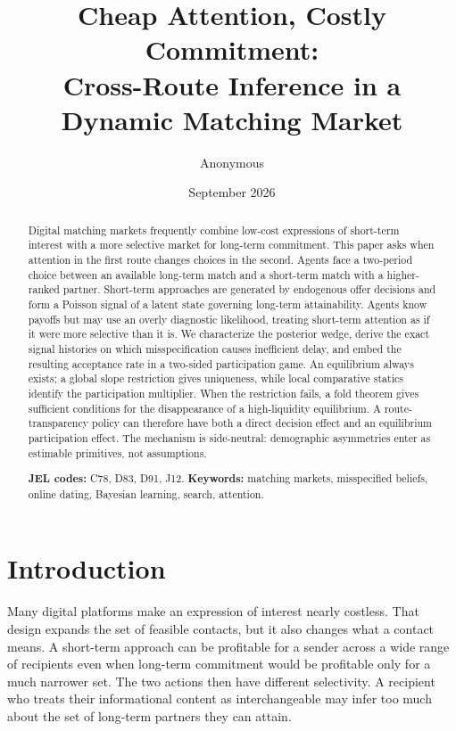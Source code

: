 \documentclass[11pt]{article}
\title{Cheap Attention, Costly Commitment:\\
Cross-Route Inference in a Dynamic Matching Market}
\author{Anonymous}
\date{September 2026}
\begin{document}
\maketitle

\begin{abstract}
Digital matching markets frequently combine low-cost expressions of short-term
interest with a more selective market for long-term commitment. This paper asks
when attention in the first route changes choices in the second. Agents face a
two-period choice between an available long-term match and a short-term match
with a higher-ranked partner. Short-term approaches are generated by endogenous
offer decisions and form a Poisson signal of a latent state governing long-term
attainability. Agents know payoffs but may use an overly diagnostic likelihood,
treating short-term attention as if it were more selective than it is. We
characterize the posterior wedge, derive the exact signal histories on which
misspecification causes inefficient delay, and embed the resulting acceptance
rate in a two-sided participation game. An equilibrium always exists; a global
slope restriction gives uniqueness, while local comparative statics identify
the participation multiplier. When the restriction fails, a fold theorem gives
sufficient conditions for the disappearance of a high-liquidity equilibrium.
A route-transparency policy can therefore have both a direct decision effect
and an equilibrium participation effect. The mechanism is side-neutral:
demographic asymmetries enter as estimable primitives, not assumptions.

\medskip
\noindent\textbf{JEL codes:} C78, D83, D91, J12.\quad
\textbf{Keywords:} matching markets, misspecified beliefs, online dating,
Bayesian learning, search, attention.
\end{abstract}

\section{Introduction}

Many digital platforms make an expression of interest nearly costless. That
design expands the set of feasible contacts, but it also changes what a contact
means. A short-term approach can be profitable for a sender across a wide range
of recipients even when long-term commitment would be profitable only for a
much narrower set. The two actions then have different selectivity. A recipient
who treats their informational content as interchangeable may infer too much
about the set of long-term partners they can attain.
\end{document}
